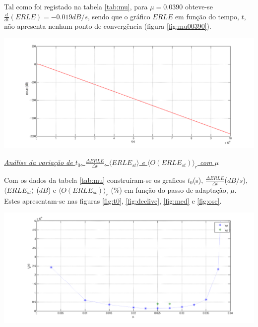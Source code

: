 \documentclass[a4paper,11pt]{report}
\begin{document}
Tal como foi registado na tabela \ref{tab:mu}, para $\mu=0.0390$ obteve-se $\frac{d}{dt}\left(ERLE\right)=-0.019dB/s$, sendo que o gráfico $ERLE$ em função do tempo, $t$, não apresenta nenhum ponto de convergência (figura \ref{fig:mu00390}). 

\begin{center}
     \includegraphics[angle=0,width=1\textwidth]{mu00390.png}
     \label{fig:mu00390}
     \end{center}
     
     
\large\underline{{\textit{Análise da variação de $t_0$, $\frac{\Delta ERLE}{\Delta t}$, $\langle ERLE_{st}\rangle$ e $\langle O(ERLE_{st})\rangle_r$ com $\mu$}}}\\
\par


Com os dados da tabela \ref{tab:mu} construíram-se os graficos $t_0$(s), $\frac{\Delta ERLE}{\Delta t}$($dB/s$), $\langle ERLE_{st}\rangle$ ($dB$) e $\langle O(ERLE_{st})\rangle_r$ ($\%$) em função do passo de adaptação, $\mu$. Estes apresentam-se nas figuras \ref{fig:t0}, \ref{fig:declive}, \ref{fig:med} e \ref{fig:osc}.

\begin{center}
     \includegraphics[angle=0,width=1\textwidth]{t0.png}
     \label{fig:t0}
     \end{center}
\end{document}
